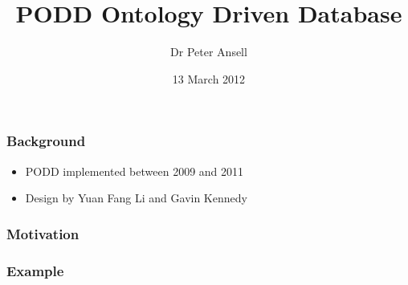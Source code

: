 \documentclass[12pt]{beamer}
\title{PODD Ontology Driven Database}
\author{Dr Peter Ansell}
\institute{University of Queensland}
\date{13 March 2012}
\begin{document}
\begin{frame}
\titlepage
\end{frame}


\begin{frame}
\frametitle{Background} 

\begin{itemize}
 \item PODD implemented between 2009 and 2011
 \item Design by Yuan Fang Li and Gavin Kennedy
\end{itemize}

\end{frame}

\begin{frame}
\frametitle{Motivation} 

\end{frame}

\begin{frame}
\frametitle{Example} 

\end{frame}

\bgroup
{}
\begin{frame}[plain]{}
\end{frame}
\egroup
\end{document}
